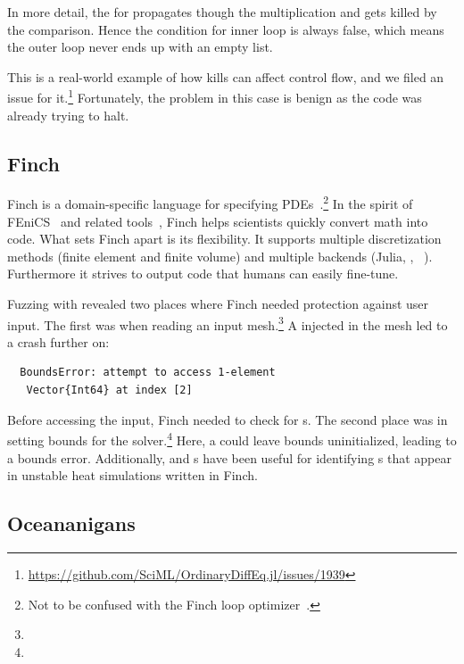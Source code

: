 \documentclass{juliacon}
\begin{document}
In more detail, the \NaN{} for  propagates though the multiplication
and gets killed by the \code{<} comparison.
Hence the condition for inner  loop is always false,
which means the outer loop never ends up with an empty list.

This is a real-world example of how \NaN{} kills can affect control flow, and we filed
an issue for it.\footnote{\url{https://github.com/SciML/OrdinaryDiffEq.jl/issues/1939}}
Fortunately, the problem in this case is benign as the code was already trying to halt.


\subsection{Finch}
\label{s:finch}

Finch is a domain-specific language for specifying
PDEs~\cite{heislerFinchDomainSpecific2022}.\footnote{Not to be confused
with the Finch loop optimizer~\cite{adka-cgo-2023}.}
In the spirit of FEniCS~\cite{fenics} and related
tools~\cite{freefem,openfoam,dune,firedrake},
Finch helps scientists quickly convert math into code.
What sets Finch apart is its flexibility.
It supports multiple discretization methods (finite element and finite
volume) and multiple backends (Julia, \CPP{}, \Dendro{}~\cite{dendro}).
Furthermore it strives to output code that humans can easily fine-tune.

Fuzzing with \FT{} revealed two places where Finch needed
protection against user input.
The first was when reading an input mesh.\footnote{}
A \NaN{} injected in the mesh led to a crash further on:

\begin{lstlisting}
  BoundsError: attempt to access 1-element
   Vector{Int64} at index [2]
\end{lstlisting}

Before accessing the input, Finch needed to check for \NaN{}s.
The second place was in setting bounds for the
solver.\footnote{}
Here, a \NaN{} could leave bounds uninitialized, leading to a bounds error.
Additionally, \FT{} and \CSTG{}s have been useful for identifying \NaN{}s that
appear in unstable heat simulations written in Finch.

\subsection{Oceananigans}
\label{s:ocean}
\end{document}
